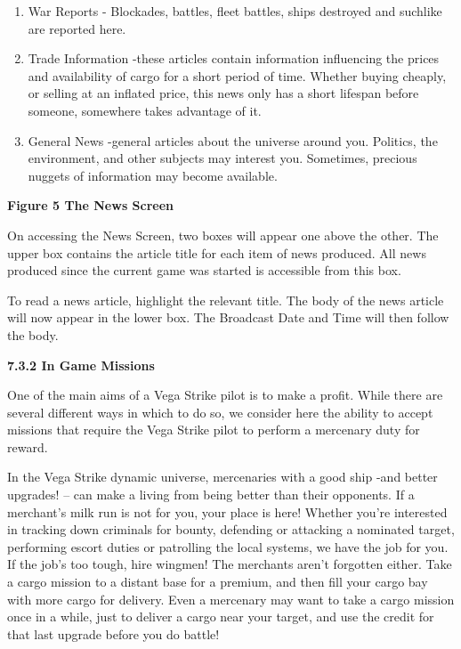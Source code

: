 \documentclass{article}
\begin{document}
\begin{enumerate}
\item  War Reports - Blockades, battles, fleet battles, ships destroyed and suchlike are reported here.  

\item  Trade Information -these articles contain information influencing the prices and availability of cargo for a short period of time. Whether buying cheaply, or selling at an inflated price, this news only has a short lifespan before someone, somewhere takes advantage of it.  

\item  General News -general articles about the universe around you. Politics, the environment, and other subjects may interest you. Sometimes, precious nuggets of information may become available. 
\end{enumerate}



\textbf{Figure 5 The News Screen}





On accessing the News Screen, two boxes will appear one above the other. The upper box contains the article title for each item of news produced. All news produced since the current game was started is accessible from this box. 

To read a news article, highlight the relevant title. The body of the news article will now appear in the lower box. The Broadcast Date and Time will then follow the body. 

\textbf{}

\textbf{7.3.2 In Game Missions }

One of the main aims of a Vega Strike pilot is to make a profit. While there are several different ways in which to do so, we consider here the ability to accept missions that require the Vega Strike pilot to perform a mercenary duty for reward. 

In the Vega Strike dynamic universe, mercenaries with a good ship -and better upgrades! -- can make a living from being better than their opponents. If a merchant's milk run is not for you, your place is here! Whether you're interested in tracking down criminals for bounty, defending or attacking a nominated target, performing escort duties or patrolling the local systems, we have the job for you. If the job's too tough, hire wingmen! The merchants aren't forgotten either. Take a cargo mission to a distant base for a premium, and then fill your cargo bay with more cargo for delivery. Even a mercenary may want to take a cargo mission once in a while, just to deliver a cargo near your target, and use the credit for that last upgrade before you do battle! 
\end{document}
